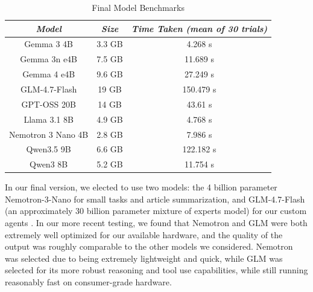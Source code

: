 \documentclass[conference]{IEEEtran}
\begin{document}
\begin{table}[ht]
    \centering
    \caption{Final Model Benchmarks}
    \begin{tabular}{|c|c|c|}
        \hline
        \textbf{\textit{Model}} & \textbf{\textit{Size}} & \textbf{\textit{Time Taken (mean of 30 trials)}} \\ \hline
        Gemma 3 4B & 3.3 GB & 4.268 s \\ \hline
        Gemma 3n e4B & 7.5 GB & 11.689 s \\ \hline
        Gemma 4 e4B & 9.6 GB & 27.249 s \\ \hline
        GLM-4.7-Flash & 19 GB & 150.479 s\\ \hline
        GPT-OSS 20B & 14 GB & 43.61 s \\ \hline
        Llama 3.1 8B & 4.9 GB & 4.768 s \\ \hline
        Nemotron 3 Nano 4B & 2.8 GB & 7.986 s \\ \hline
        Qwen3.5 9B & 6.6 GB & 122.182 s \\ \hline
        Qwen3 8B & 5.2 GB & 11.754 s \\ \hline
    \end{tabular}
    \label{tab:modelBenchmarks2}
\end{table}

In our final version, we elected to use two models: the 4 billion parameter Nemotron-3-Nano for small tasks and article summarization, and GLM-4.7-Flash (an approximately 30 billion parameter mixture of experts model) for our custom agents \cite{nemotron, glm}. In our more recent testing, we found that Nemotron and GLM were both extremely well optimized for our available hardware, and the quality of the output was roughly comparable to the other models we considered. Nemotron was selected due to being extremely lightweight and quick, while GLM was selected for its more robust reasoning and tool use capabilities, while still running reasonably fast on consumer-grade hardware.
\end{document}
